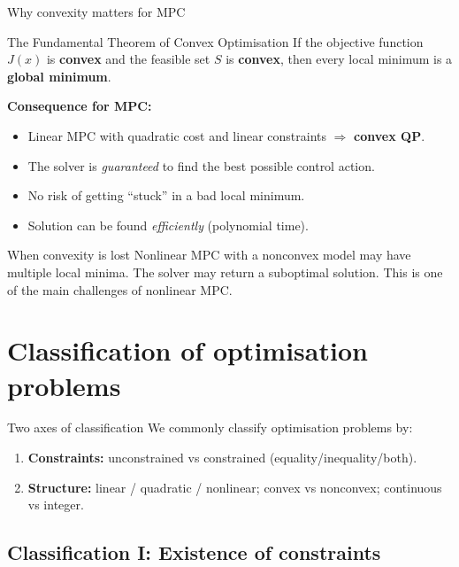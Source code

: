 \documentclass[aspectratio=169,10pt]{beamer}
\begin{document}
\begin{frame}{Why convexity matters for MPC}
\begin{defnbox}{The Fundamental Theorem of Convex Optimisation}
If the objective function $J(x)$ is \textbf{convex} and the feasible set $S$ is \textbf{convex}, then every local minimum is a \textbf{global minimum}.
\end{defnbox}

\vspace{0.5em}
\textbf{Consequence for MPC:}
\begin{itemize}
  \item Linear MPC with quadratic cost and linear constraints $\Rightarrow$ \textbf{convex QP}.
  \item The solver is \emph{guaranteed} to find the best possible control action.
  \item No risk of getting ``stuck'' in a bad local minimum.
  \item Solution can be found \emph{efficiently} (polynomial time).
\end{itemize}

\vspace{0.5em}
\begin{alertbox}{When convexity is lost}
Nonlinear MPC with a nonconvex model may have multiple local minima. The solver may return a suboptimal solution. This is one of the main challenges of nonlinear MPC.
\end{alertbox}
\end{frame}

\section{Classification of optimisation problems}

\begin{frame}{Two axes of classification}
We commonly classify optimisation problems by:
\begin{enumerate}
  \item \textbf{Constraints:} unconstrained vs constrained (equality/inequality/both).
  \item \textbf{Structure:} linear / quadratic / nonlinear; convex vs nonconvex; continuous vs integer.
\end{enumerate}
\end{frame}

\subsection{Classification I: Existence of constraints}
\end{document}
